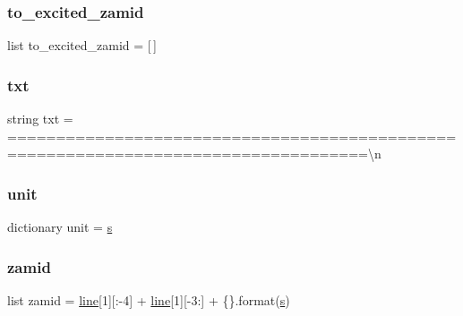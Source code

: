 \subsubsection{\texorpdfstring{to\+\_\+excited\+\_\+zamid}{to\_excited\_zamid}}
{\footnotesize\ttfamily list to\+\_\+excited\+\_\+zamid = \mbox{[}$\,$\mbox{]}}

\mbox{\label{namespaceconv__nndc__decaylib_af306301328dca1eed4e07dc5350e8569}} 
\subsubsection{\texorpdfstring{txt}{txt}}
{\footnotesize\ttfamily string txt = \textquotesingle{}===================================================================================\textbackslash{}n\textquotesingle{}}

\mbox{\label{namespaceconv__nndc__decaylib_abfdca6d34fa953eb4ec33554ca69256a}} 
\subsubsection{\texorpdfstring{unit}{unit}}
{\footnotesize\ttfamily dictionary unit = \textquotesingle{}\mbox{\hyperlink{namespaceconv__nndc__decaylib_a3691308f2a4c2f6983f2880d32e29c84}{s}}\textquotesingle{}}

\mbox{\label{namespaceconv__nndc__decaylib_af70f0d4a2383a49278fdbcb77d9c5075}} 
\subsubsection{\texorpdfstring{zamid}{zamid}}
{\footnotesize\ttfamily list zamid = \mbox{\hyperlink{namespaceconv__nndc__decaylib_a4fa05b1f00fcde100685cc887554b93b}{line}}\mbox{[}1\mbox{]}\mbox{[}\+:-\/4\mbox{]} + \mbox{\hyperlink{namespaceconv__nndc__decaylib_a4fa05b1f00fcde100685cc887554b93b}{line}}\mbox{[}1\mbox{]}\mbox{[}-\/3\+:\mbox{]} + \textquotesingle{}\{\}\textquotesingle{}.format(\mbox{\hyperlink{namespaceconv__nndc__decaylib_a3691308f2a4c2f6983f2880d32e29c84}{s}})}

